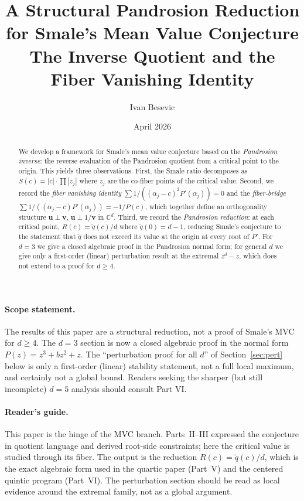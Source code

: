 \documentclass[11pt,a4paper]{article}
\title{A Structural Pandrosion Reduction for Smale's Mean Value Conjecture \\ The Inverse Quotient and the Fiber Vanishing Identity}
\author{Ivan Besevic}
\date{April 2026}
\begin{document}
\maketitle

\begin{abstract}
We develop a framework for Smale's mean value conjecture based on the \emph{Pandrosion inverse}: the reverse evaluation of the Pandrosion quotient from a critical point to the origin. This yields three observations. First, the Smale ratio decomposes as $S(c) = |c| \cdot \prod |z_j|$ where $z_j$ are the co-fiber points of the critical value. Second, we record the \emph{fiber vanishing identity} $\sum 1/((\alpha_j - c)^2 P'(\alpha_j)) = 0$ and the \emph{fiber-bridge} $\sum 1/((\alpha_j - c) P'(\alpha_j)) = -1/P(c)$, which together define an orthogonality structure $\mathbf{u} \perp \mathbf{v}$, $\mathbf{u} \perp 1/\mathbf{v}$ in $\mathbb{C}^d$. Third, we record the \emph{Pandrosion reduction}: at each critical point, $R(c) = \tilde q(c)/d$ where $\tilde q(0) = d - 1$, reducing Smale's conjecture to the statement that $\tilde q$ does not exceed its value at the origin at every root of $P'$. For $d = 3$ we give a closed algebraic proof in the Pandrosion normal form; for general $d$ we give only a first-order (linear) perturbation result at the extremal $z^d - z$, which does not extend to a proof for $d \ge 4$.
\end{abstract}

\paragraph{Scope statement.} The results of this paper are a structural reduction, not a proof of Smale's MVC for $d \ge 4$. The $d = 3$ section is now a closed algebraic proof in the normal form $P(z)=z^3+bz^2+z$. The ``perturbation proof for all $d$'' of Section~\ref{sec:pert} below is only a first-order (linear) stability statement, not a full local maximum, and certainly not a global bound. Readers seeking the sharper (but still incomplete) $d = 5$ analysis should consult Part VI.

\paragraph{Reader's guide.}
This paper is the hinge of the MVC branch. Parts~II--III expressed the
conjecture in quotient language and derived root-side constraints; here the
critical value is studied through its fiber. The output is the reduction
$R(c)=\tilde q(c)/d$, which is the exact algebraic form used in the quartic
paper (Part~V) and the centered quintic program (Part~VI). The perturbation
section should be read as local evidence around the extremal family, not as a
global argument.
\end{document}
